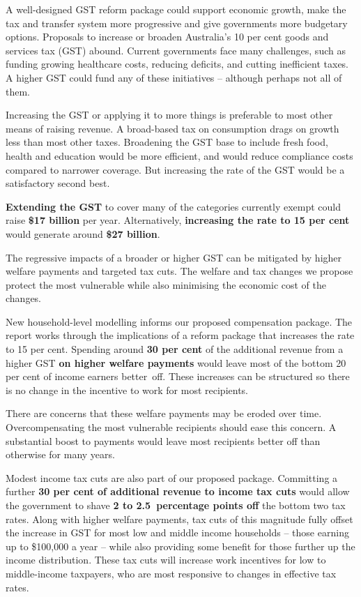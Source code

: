 

\setlength{\overviewextra}{2pt}
\addtolength{\columnsep}{\overviewextra}
\begin{overview}[-20pt]
A well-designed GST reform package could support economic growth, make the tax and transfer system more progressive and give governments more budgetary options.
Proposals to increase or broaden Australia’s 10 per cent goods and services tax (GST) abound. Current governments face many challenges, such as funding growing healthcare costs, reducing deficits, and cutting inefficient taxes. A higher GST could fund any of these initiatives – although perhaps not all of them. 

Increasing the GST or applying it to more things is preferable to most other means of raising revenue. A broad-based tax on consumption drags on growth less than most other taxes. Broadening the GST base to include fresh food, health and education would be more efficient, and would reduce compliance costs compared to narrower coverage. But increasing the rate of the GST would be a satisfactory second best.  

\textbf{Extending the GST} to cover many of the categories currently exempt could raise \textbf{\$17 billion} per year. Alternatively, \textbf{increasing the rate to 15 per cent} would generate around \textbf{\$27 billion}. 

The regressive impacts of a broader or higher GST can be mitigated by higher welfare payments and targeted tax cuts. The welfare and tax changes we propose protect the most vulnerable while also minimising the economic cost of the changes. 

New household-level modelling informs our proposed compensation package. The report works through the implications of a reform package that increases the rate to 15 per cent. Spending around \textbf{30 per cent} of the additional revenue from a higher GST \textbf{on higher welfare payments} would leave most of the bottom 20 per cent of income earners better~off. These increases can be structured so there is no change in the incentive to work for most recipients. 

There are concerns that these welfare payments may be eroded over time. Overcompensating the most vulnerable recipients should ease this concern. A substantial boost to payments would leave most recipients better off than otherwise for many years.

Modest income tax cuts are also part of our proposed package. Committing a further \textbf{30 per cent of additional revenue to income tax cuts} would allow the government to shave \textbf{2 to 2.5~percentage points off} the bottom two tax rates. Along with higher welfare payments, tax cuts of this magnitude fully offset the increase in GST for most low and middle income households – those earning up to \$100,000 a year – while also providing some benefit for those further up the income distribution. These tax cuts will increase work incentives for low to middle-income taxpayers, who are most responsive to changes in effective tax rates. 


\end{overview}

